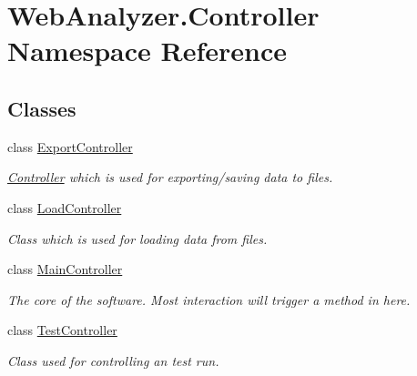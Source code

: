 \hypertarget{namespace_web_analyzer_1_1_controller}{}\section{Web\+Analyzer.\+Controller Namespace Reference}
\label{namespace_web_analyzer_1_1_controller}
\subsection*{Classes}
\begin{DoxyCompactItemize}
\item 
class \hyperlink{class_web_analyzer_1_1_controller_1_1_export_controller}{Export\+Controller}
\begin{DoxyCompactList}\small\item\em \hyperlink{namespace_web_analyzer_1_1_controller}{Controller} which is used for exporting/saving data to files. \end{DoxyCompactList}\item 
class \hyperlink{class_web_analyzer_1_1_controller_1_1_load_controller}{Load\+Controller}
\begin{DoxyCompactList}\small\item\em Class which is used for loading data from files. \end{DoxyCompactList}\item 
class \hyperlink{class_web_analyzer_1_1_controller_1_1_main_controller}{Main\+Controller}
\begin{DoxyCompactList}\small\item\em The core of the software. Most interaction will trigger a method in here. \end{DoxyCompactList}\item 
class \hyperlink{class_web_analyzer_1_1_controller_1_1_test_controller}{Test\+Controller}
\begin{DoxyCompactList}\small\item\em Class used for controlling an test run. \end{DoxyCompactList}\end{DoxyCompactItemize}
